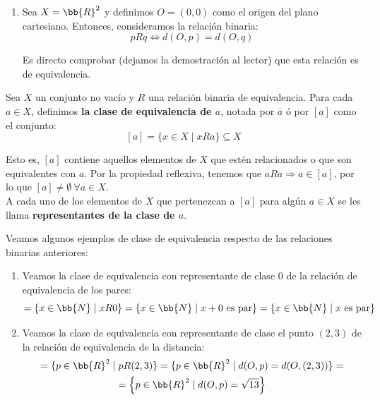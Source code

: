 \begin{ejemplo}
\begin{enumerate}
    \item Sea $X=\bb{R}^2$ y definimos $O=(0,0)$ como el origen del plano cartesiano. Entonces, consideramos la relación binaria:
    \begin{equation*}
        pRq \Longleftrightarrow d(O,p) = d(O,q)
    \end{equation*}

    Es directo comprobar (dejamos la demostración al lector) que esta relación es de equivalencia.
\end{enumerate}
\end{ejemplo}

\begin{definicion}
    Sea $X$ un conjunto no vacío y $R$ una relación binaria de equivalencia. Para cada $a \in X$, definimos \textbf{la clase de equivalencia de $a$}, notada por $\overline{a}$ ó por $[a]$ como el conjunto:
    $$[a] = \{x \in X \mid xRa\} \subseteq X$$
\end{definicion}

Esto es, $[a]$ contiene aquellos elementos de $X$ que estén relacionados o que son equivalentes con $a$.
Por la propiedad reflexiva, tenemos que $aRa \Rightarrow a \in [a]$, por lo que $ [a] \neq \emptyset~\forall a \in X$.\\


A cada uno de los elementos de $X$ que pertenezcan a $[a]$ para algún $a \in X$ se les llama \textbf{representantes de la clase de $a$}.

\begin{ejemplo} Veamos algunos ejemplos de clase de equivalencia respecto de las relaciones binarias anteriores:
\begin{enumerate}
    \item[2.] Veamos la clase de equivalencia con representante de clase $0$ de la relación de equivalencia de los pares:
    \begin{equation*}
        [0] = \{x\in \bb{N}\mid xR0\} = \{x\in \bb{N}\mid x+0 \text{ es par}\} = \{x\in \bb{N}\mid x \text{ es par}\}
    \end{equation*}

    \item[3.] Veamos la clase de equivalencia con representante de clase el punto $(2,3)$ de la relación de equivalencia de la distancia:
    \begin{multline*}
        [(2,3)] = \{p\in \bb{R}^2\mid pR(2,3)\} = \{p\in \bb{R}^2\mid d(O,p)=d(O,(2,3))\} =\\= \left\{p\in \bb{R}^2\mid d(O,p)=\sqrt{13}\right\}
    \end{multline*}
\end{enumerate}
\end{ejemplo}

